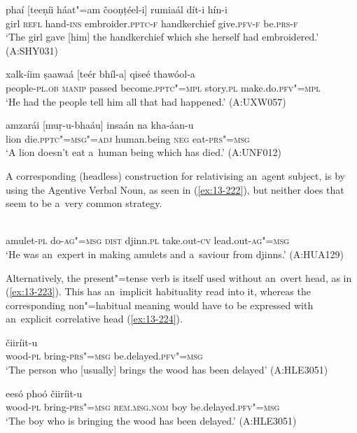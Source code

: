 \begin{exe}
\ex
\label{ex:13-219}
\gll phaí [teeṇíi háat"=am čooṇṭéel-i] rumiaál dít-i  hín-i \\
girl \textsc{refl} hand-\textsc{ins} embroider.\textsc{pptc-f} handkerchief give.\textsc{pfv-f} be.\textsc{prs-f} \\
\glt `The girl gave [him] the handkerchief which she herself had embroidered.' (A:SHY031)

\ex
\label{ex:13-220}
\gll xalk-íim ṣaawaá [teér bhíl-a] qiseé  thawóol-a \\
people-\textsc{pl.ob} \textsc{manip} passed become.\textsc{pptc"=mpl} story.\textsc{pl} make.do.\textsc{pfv"=mpl} \\
\glt `He had the people tell him all that had happened.' (A:UXW057)

\ex
\label{ex:13-221}
\gll amzarái [muṛ-u-bhaáu] insaán na  kha-áan-u \\
lion die.\textsc{pptc"=msg"=adj} human.being \textsc{neg} eat-\textsc{prs"=msg} \\
\glt `A lion doesn't eat a~human being which has died.' (A:UNF012) 
\end{exe}

A corresponding (headless) construction for relativising an~agent subject, is by using the Agentive Verbal Noun, as seen in (\ref{ex:13-222}), but neither does that seem to be a~very common strategy. 

\begin{exe}
\ex
\label{ex:13-222}
 \\
amulet-\textsc{pl} do-\textsc{ag"=msg} \textsc{dist} djinn.\textsc{pl} take.out-\textsc{cv} lead.out-\textsc{ag"=msg} \\
\glt `He was an~expert in making amulets and a~saviour from djinns.' (A:HUA129) 
\end{exe}

Alternatively, the present"=tense verb is itself used without an~overt head, as in (\ref{ex:13-223}). This has an~implicit habituality read into it, whereas the corresponding non"=habitual meaning would have to be expressed with an~explicit correlative head (\ref{ex:13-224}).

\begin{exe}
\ex
\label{ex:13-223}
 čiiríit-u  \\
wood-\textsc{pl} bring-\textsc{prs"=msg} be.delayed.\textsc{pfv"=msg} \\
\glt `The person who [usually] brings the wood has been delayed' (A:HLE3051)

\ex
\label{ex:13-224}
 eesó phoó čiiríit-u  \\
wood-\textsc{pl} bring-\textsc{prs"=msg} \textsc{rem.ms}\textsc{g.}\textsc{nom} boy be.delayed.\textsc{pfv"=msg}  \\
\glt `The boy who is bringing the wood has been delayed.' (A:HLE3051)
\end{exe}

